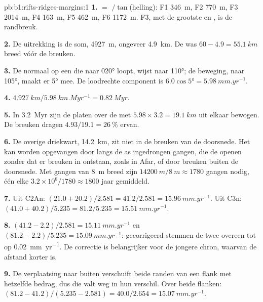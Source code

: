 \begin{solution}{pb:b1:rifts-ridges-margins:1}
\textbf{1.}  $= $ $/\tan$(helling): F1 \qty{346}{m}, F2 \qty{770}{m},
F3 \qty{2014}{m}, F4 \qty{163}{m}, F5 \qty{462}{m}, F6 \qty{1172}{m}. F3, met
de grootste  en , is de randbreuk.

\textbf{2.} De uitrekking is de som, \qty{4927}{m}, ongeveer \qty{4.9}{km}. De
 was $60 - 4.9 = \qty{55.1}{km}$ breed vóór de breuken.

\textbf{3.} De normaal op een  die naar \ang{020} loopt, wijst naar
\ang{110}; de beweging, naar \ang{105}, maakt er \ang{5} mee. De loodrechte
component is $6.0\cos\ang{5} = \qty{5.98}{mm.yr^{-1}}$.

\textbf{4.} $\qty{4.927}{km}/\qty{5.98}{km.Myr^{-1}} = \qty{0.82}{Myr}$.

\textbf{5.} In \qty{3.2}{Myr} zijn de platen over de  met
$5.98\times3.2 = \qty{19.1}{km}$ uit elkaar bewogen. De breuken dragen
$4.93/19.1 = \qty{26}{\percent}$ ervan.

\textbf{6.} De overige driekwart, \qty{14.2}{km}, zit niet in de breuken van de
doorsnede. Het kan worden opgevangen door langs de as ingedrongen gangen, die de
 openen zonder dat er breuken in ontstaan, zoals in Afar, of door breuken
buiten de doorsnede. Met gangen van \qty{8}{m} breed zijn
$\qty{14200}{m}/\qty{8}{m} \approx 1780$ gangen nodig, één elke
$3.2\times10^6/1780 \approx 1800$ jaar gemiddeld.

\textbf{7.} Uit C2An: $(21.0 + 20.2)/2.581 = 41.2/2.581 =
\qty{15.96}{mm.yr^{-1}}$. Uit C3n: $(41.0 + 40.2)/5.235 = 81.2/5.235 =
\qty{15.51}{mm.yr^{-1}}$.

\textbf{8.} $(41.2 - 2.2)/2.581 = \qty{15.11}{mm.yr^{-1}}$ en
$(81.2 - 2.2)/5.235 = \qty{15.09}{mm.yr^{-1}}$: gecorrigeerd stemmen de twee
overeen tot op \qty{0.02}{mm.yr^{-1}}. De correctie is belangrijker voor de
jongere chron, waarvan de afstand korter is.

\textbf{9.} De verplaatsing naar buiten verschuift beide randen van een flank
met hetzelfde bedrag, dus die valt weg in hun verschil. Over beide flanken:
$(81.2 - 41.2)/(5.235 - 2.581) = 40.0/2.654 = \qty{15.07}{mm.yr^{-1}}$.


\end{solution}
